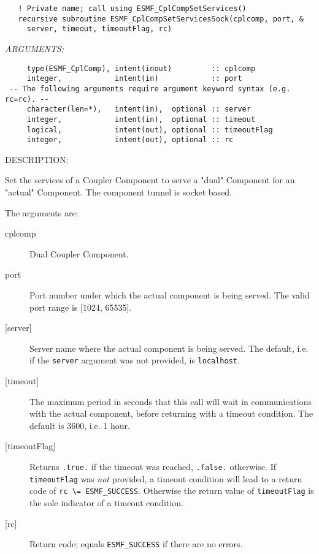   
\begin{verbatim}   ! Private name; call using ESMF_CplCompSetServices()
   recursive subroutine ESMF_CplCompSetServicesSock(cplcomp, port, &
     server, timeout, timeoutFlag, rc)\end{verbatim}{\em ARGUMENTS:}
\begin{verbatim}     type(ESMF_CplComp), intent(inout)         :: cplcomp
     integer,            intent(in)            :: port
 -- The following arguments require argument keyword syntax (e.g. rc=rc). --
     character(len=*),   intent(in),  optional :: server
     integer,            intent(in),  optional :: timeout
     logical,            intent(out), optional :: timeoutFlag
     integer,            intent(out), optional :: rc\end{verbatim}
{\sf DESCRIPTION:\\ }


   Set the services of a Coupler Component to serve a "dual" Component for an
   "actual" Component. The component tunnel is socket based.
  
   The arguments are:
   \begin{description}
   \item[cplcomp]
     Dual Coupler Component.
   \item[port]
     Port number under which the actual component is being served. The valid
     port range is [1024, 65535].
   \item[{[server]}]
     Server name where the actual component is being served. The default, i.e.
     if the {\tt server} argument was not provided, is {\tt localhost}.
   \item[{[timeout]}]
     The maximum period in seconds that this call will wait in communications
     with the actual component, before returning with a timeout condition.
     The default is 3600, i.e. 1 hour.
   \item[{[timeoutFlag]}]
     Returns {\tt .true.} if the timeout was reached, {\tt .false.} otherwise.
     If {\tt timeoutFlag} was {\em not} provided, a timeout condition will lead
     to a return code of {\tt rc \textbackslash = ESMF\_SUCCESS}. Otherwise the
     return value of {\tt timeoutFlag} is the sole indicator of a timeout
     condition.
   \item[{[rc]}]
     Return code; equals {\tt ESMF\_SUCCESS} if there are no errors.
   \end{description}
   
 
